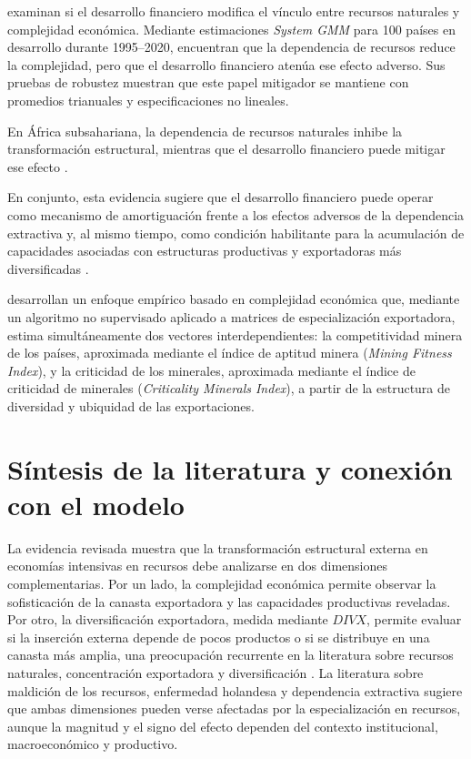 \documentclass[../../TFM.tex]{subfiles}
\begin{document}
	\textcite{Valentine2024} examinan si el desarrollo financiero modifica el vínculo entre recursos naturales y complejidad económica. Mediante estimaciones \textit{System GMM} para 100 países en desarrollo durante 1995--2020, encuentran que la dependencia de recursos reduce la complejidad, pero que el desarrollo financiero atenúa ese efecto adverso. Sus pruebas de robustez muestran que este papel mitigador se mantiene con promedios trianuales y especificaciones no lineales.
	
	En África subsahariana, la dependencia de recursos naturales inhibe la transformación estructural, mientras que el desarrollo financiero puede mitigar ese efecto \parencite{Nwani2023}.
	
	En conjunto, esta evidencia sugiere que el desarrollo financiero puede operar como mecanismo de amortiguación frente a los efectos adversos de la dependencia extractiva y, al mismo tiempo, como condición habilitante para la acumulación de capacidades asociadas con estructuras productivas y exportadoras más diversificadas \parencite{Valentine2024,Nieminen2020,Nwani2023,Lashitew2021}.
	
	\textcite{ValverdeCarbonell2023} desarrollan un enfoque empírico basado en complejidad económica que, mediante un algoritmo no supervisado aplicado a matrices de especialización exportadora, estima simultáneamente dos vectores interdependientes: la competitividad minera de los países, aproximada mediante el índice de aptitud minera (\textit{Mining Fitness Index}), y la criticidad de los minerales, aproximada mediante el índice de criticidad de minerales (\textit{Criticality Minerals Index}), a partir de la estructura de diversidad y ubiquidad de las exportaciones.

	\section{Síntesis de la literatura y conexión con el modelo}
	\label{sec:sintesis-literatura-modelo}

	La evidencia revisada muestra que la transformación estructural externa en economías intensivas en recursos debe analizarse en dos dimensiones complementarias. Por un lado, la complejidad económica permite observar la sofisticación de la canasta exportadora y las capacidades productivas reveladas. Por otro, la diversificación exportadora, medida mediante $DIVX$, permite evaluar si la inserción externa depende de pocos productos o si se distribuye en una canasta más amplia, una preocupación recurrente en la literatura sobre recursos naturales, concentración exportadora y diversificación \parencite{Harding2016,Bahar2018,Joya2015,Lashitew2021}. La literatura sobre maldición de los recursos, enfermedad holandesa y dependencia extractiva sugiere que ambas dimensiones pueden verse afectadas por la especialización en recursos, aunque la magnitud y el signo del efecto dependen del contexto institucional, macroeconómico y productivo.
\end{document}
